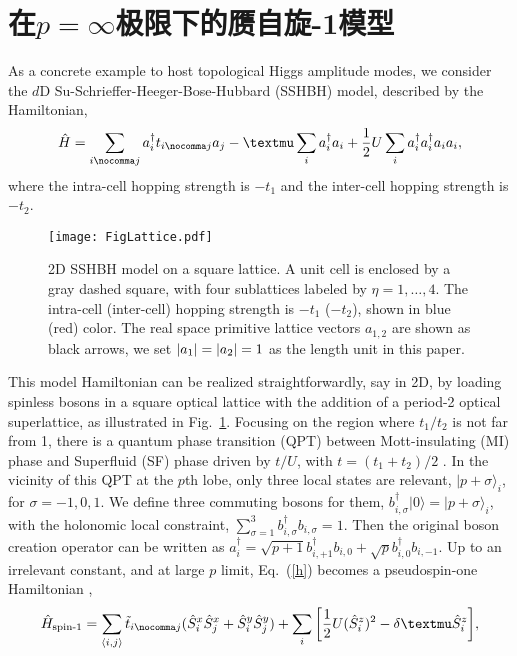 \section{在$p=\infty$极限下的赝自旋-1模型}
As a concrete example to host topological Higgs amplitude modes,
we consider the $d$D Su-Schrieffer-Heeger-Bose-Hubbard (SSHBH) model,
described by the Hamiltonian,
\begin{equation}
  \hat{H} = \sum_{i \nocomma j} a_i^{\dag} t_{i \nocomma j} a_j - \mu \sum_i
  a_i^{\dag} a_i + \frac{1}{2}U \sum_i a^{\dag}_i a_i^{\dag} a_i a_i, \label{h}
\end{equation}
where the intra-cell hopping strength is $- t_1$ and the inter-cell hopping strength is $- t_2$.%
\begin{figure}[t]
    \texttt{[image: FigLattice.pdf]}
    \caption{\label{lattice}2D SSHBH model on a square lattice.
    A unit cell is enclosed by a gray dashed square, with four sublattices labeled by $\eta=1,\dots,4$.
    The intra-cell (inter-cell) hopping strength is $-t_1$ ($-t_2$),
    shown in blue (red) color. The real space primitive lattice vectors $a_{1,2}$ are shown as black arrows, we set $\abs{a_1}=\abs{a_2}=1$ as the length unit in this paper.}
\end{figure}
This model Hamiltonian can be realized straightforwardly, say in 2D, by loading spinless bosons in a square optical lattice with the addition of a period-2 optical superlattice,
as illustrated in Fig.~\ref{lattice}.
Focusing on the region where $t_1 / t_2$ is not far from 1,
there is a quantum phase transition (QPT) between Mott-insulating (MI) phase and Superfluid (SF) phase driven by $t / U$,
with $t = (t_1 + t_2)/2$ \cite{Fisher1989}.
In the vicinity of this QPT at the $p$th lobe,
only three local states are relevant,
$| p + \sigma \rangle_i$,
for $\sigma = - 1, 0, 1$.
We define three commuting bosons for them,
$b_{i, \sigma}^{\dag} | 0 \rangle = | p + \sigma \rangle_i$,
with the holonomic local constraint,
$\sum_{\sigma=1}^3 b_{i, \sigma}^{\dag} b_{i, \sigma} = 1$.
Then the original boson creation operator can be written as $a^{\dag}_i = \sqrt{p + 1}
b^{\dag}_{i, + 1} b_{i, 0} + \sqrt{p} b_{i, 0}^{\dag} b_{i, - 1}$.
Up to an irrelevant constant,
and at large $p$ limit,
Eq.~(\ref{h}) becomes a pseudospin-one Hamiltonian \cite{Altman2002},
\begin{equation}
  \hat{H}_{\text{spin-1}} = \sum_{\langle i, j \rangle} \tilde{t}_{i \nocomma j}
  (\hat{S}_i^x \hat{S}_j^x + \hat{S}_i^y \hat{S}_j^y) +  \sum_i \bigg[\frac{1}{2}U
  (\hat{S}_i^z)^2 - \delta \mu \hat{S}_i^z \bigg], \label{heff}
\end{equation}
